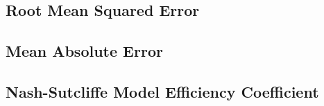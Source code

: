 \subsection{Root Mean Squared Error}
\lipsum[1-7]

\subsection{Mean Absolute Error}
\lipsum[1-7]

\subsection{Nash-Sutcliffe Model Efficiency Coefficient}
\lipsum[1-7]
